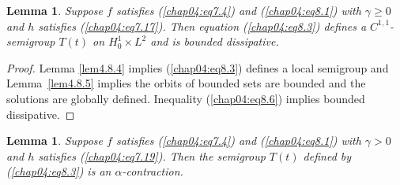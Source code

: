 \documentclass{surv-l}
\theoremstyle{plain}
\newtheorem{lemma}[theorem]{Lemma}
\theoremstyle{definition}
\numberwithin{equation}{section}
\numberwithin{figure}{chapter}
\begin{document}
\begin{lemma}\label{lem4.8.6} Suppose $f$ satisfies \emph{(\ref{chap04:eq7.4})} and \emph{(\ref{chap04:eq8.1})} with $\gamma\geq 0$ and $h$ satisfies \emph{(\ref{chap04:eq7.17})}. Then equation \emph{(\ref{chap04:eq8.3})} defines a $C^{1,1}$-semigroup $T(t)$ on $H_{0}^{1}\times L^{2}$ and is bounded dissipative.
\end{lemma}

\begin{proof} Lemma \ref{lem4.8.4} implies (\ref{chap04:eq8.3}) defines a local semigroup and Lemma~\ref{lem4.8.5} implies the orbits of bounded sets are bounded and the solutions are globally defined. Inequality (\ref{chap04:eq8.6}) implies bounded dissipative.
\end{proof}

\begin{lemma}\label{lem4.8.7} Suppose $f$ satisfies \emph{(\ref{chap04:eq7.4})} and \emph{(\ref{chap04:eq8.1})} with $\gamma>0$ and $h$ satisfies \emph{(\ref{chap04:eq7.19})}. Then the semigroup $T(t)$ defined by \emph{(\ref{chap04:eq8.3})} is an $\alpha$-contraction.
\end{lemma}
\end{document}
